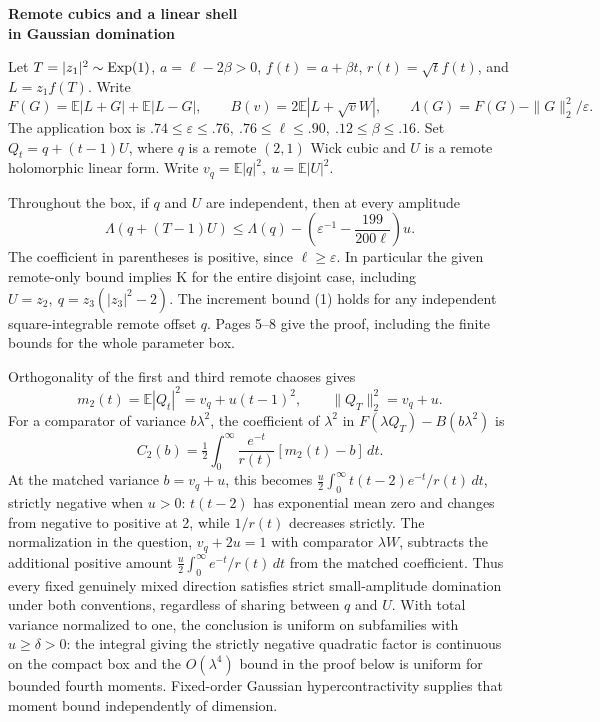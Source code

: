 \documentclass[11pt]{article}
\newcommand{\E}{\mathbb E}\newcommand{\C}{\mathbb C}\newcommand{\R}{\mathbb R}
\newcommand{\head}[1]{\par\smallskip{\large\bfseries\color{ink}#1}\par\smallskip}
\newcommand{\subhead}[1]{\par\smallskip{\bfseries\color{ink}#1}\enspace}
\begin{document}
\thispagestyle{plain}
{\LARGE\bfseries\color{ink} Remote cubics and a linear shell\\[2pt] in Gaussian domination\par}
\medskip
Let \(T=|z_1|^2\sim{\rm Exp}(1)\), \(a=\ell-2\beta>0\), \(f(t)=a+\beta t\),
\(r(t)=\sqrt t f(t)\), and \(L=z_1f(T)\). Write
\[
 F(G)=\E|L+G|+\E|L-G|,\qquad B(v)=2\E|L+\sqrt vW|,\qquad
 \Lambda(G)=F(G)-\|G\|_2^2/\varepsilon .
\]
The application box is \(.74\le\varepsilon\le.76,\ .76\le\ell\le.90,\ .12\le\beta\le.16\).
Set \(Q_t=q+(t-1)U\), where \(q\) is a remote \((2,1)\) Wick cubic and \(U\) is
a remote holomorphic linear form. Write \(v_q=\E|q|^2,\ u=\E|U|^2\).

\subhead{Main theorem.}
Throughout the box, if \(q\) and \(U\) are independent, then at every amplitude
\[
 \boxed{\quad
 \Lambda(q+(T-1)U)\le\Lambda(q)
       -\left(\varepsilon^{-1}-\frac{199}{200\ell}\right)u .
 \quad} \tag{1}
\]
The coefficient in parentheses is positive, since \(\ell\ge\varepsilon\). In particular
the given remote-only bound implies K for the entire disjoint case, including
\(U=z_2,\ q=z_3(|z_3|^2-2)\). The increment bound (1) holds for any independent
square-integrable remote offset \(q\). Pages 5--8 give the proof, including the
finite bounds for the whole parameter box.

\head{R4. The quadratic term}
Orthogonality of the first and third remote chaoses gives
\[
 m_2(t)=\E|Q_t|^2=v_q+u(t-1)^2,\qquad \|Q_T\|_2^2=v_q+u .
\]
For a comparator of variance \(b\lambda^2\), the coefficient of \(\lambda^2\) in
\(F(\lambda Q_T)-B(b\lambda^2)\) is
\[
 C_2(b)=\tfrac12\int_0^\infty \frac{e^{-t}}{r(t)}[m_2(t)-b]\,dt.
 \tag{2}
\]
At the matched variance \(b=v_q+u\), this becomes
\( \frac u2\int_0^\infty t(t-2)e^{-t}/r(t)\,dt\), strictly negative when \(u>0\):
\(t(t-2)\) has exponential mean zero and changes from negative to positive at 2,
while \(1/r(t)\) decreases strictly. The normalization in the question, \(v_q+2u=1\)
with comparator \(\lambda W\), subtracts the additional positive amount
\(\frac u2\int_0^\infty e^{-t}/r(t)\,dt\) from the matched coefficient.
Thus every fixed genuinely mixed direction satisfies strict small-amplitude
domination under both conventions, regardless of sharing between \(q\) and \(U\).
With total variance normalized to one, the conclusion is uniform on subfamilies
with \(u\ge\delta>0\): the integral giving the strictly negative quadratic factor
is continuous on the compact box and the \(O(\lambda^4)\) bound in the proof
below is uniform for bounded fourth moments. Fixed-order Gaussian hypercontractivity
supplies that moment bound independently of dimension.
\end{document}
